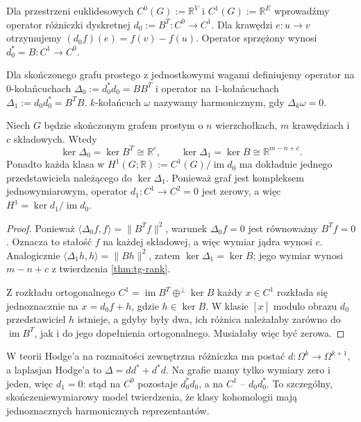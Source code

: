 Dla przestrzeni euklidesowych $C^0(G):=\mathbb R^V$
i $C^1(G):=\mathbb R^E$ wprowadźmy operator
różniczki dyskretnej $d_0:=B^T:C^0\to C^1$.
Dla krawędzi $e:u\to v$ otrzymujemy
$(d_0f)(e)=f(v)-f(u)$.
Operator sprzężony wynosi $d_0^*=B:C^1\to C^0$.

\begin{definicja}
Dla skończonego grafu prostego z jednostkowymi wagami
definiujemy operator na $0$-kołańcuchach
$\Delta_0:=d_0^*d_0=BB^T$ i operator na
$1$-kołańcuchach $\Delta_1:=d_0d_0^*=B^TB$.
$k$-kołańcuch $\omega$ nazywamy harmonicznym,
gdy $\Delta_k\omega=0$.
\end{definicja}

\begin{twierdzenie}
\label{thm:tg-hodge-harmonic}
Niech $G$ będzie skończonym grafem prostym o $n$ wierzchołkach,
$m$ krawędziach i $c$ składowych. Wtedy
\[
\ker\Delta_0=\ker B^T\cong\mathbb R^c,
\qquad
\ker\Delta_1=\ker B\cong\mathbb R^{m-n+c}.
\]
Ponadto każda klasa w
$H^1(G;\mathbb R):=C^1(G)/\operatorname{im}d_0$
ma dokładnie jednego przedstawiciela należącego do
$\ker\Delta_1$. Ponieważ graf jest kompleksem
jednowymiarowym, operator $d_1:C^1\to C^2=0$ jest zerowy,
a więc $H^1=\ker d_1/\operatorname{im}d_0$.
\end{twierdzenie}

\begin{proof}
Ponieważ $\langle\Delta_0f,f\rangle=\|B^Tf\|^2$,
warunek $\Delta_0f=0$ jest równoważny $B^Tf=0$.
Oznacza to stałość $f$ na każdej składowej,
a więc wymiar jądra wynosi $c$.
Analogicznie $\langle\Delta_1h,h\rangle=\|Bh\|^2$,
zatem $\ker\Delta_1=\ker B$; jego wymiar
wynosi $m-n+c$ z twierdzenia \ref{thm:tg-rank}.

Z rozkładu ortogonalnego
$C^1=\operatorname{im}B^T\oplus^\perp\ker B$
każdy $x\in C^1$ rozkłada się jednoznacznie na
$x=d_0f+h$, gdzie $h\in\ker B$. W klasie $[x]$
modulo obrazu $d_0$ przedstawiciel $h$ istnieje,
a gdyby były dwa, ich różnica należałaby zarówno
do $\operatorname{im}B^T$, jak i do jego dopełnienia
ortogonalnego. Musiałaby więc być zerowa.
\end{proof}

\begin{uwaga}
W teorii Hodge'a na rozmaitości zewnętrzna różniczka
ma postać $d:\Omega^k\to\Omega^{k+1}$, a laplasjan
Hodge'a to $\Delta=dd^*+d^*d$. Na grafie mamy tylko
wymiary zero i jeden, więc $d_1=0$: stąd na
$C^0$ pozostaje $d_0^*d_0$, a na $C^1$ -- $d_0d_0^*$.
To szczególny, skończeniewymiarowy model twierdzenia,
że klasy kohomologii mają jednoznacznych harmonicznych
reprezentantów.
\end{uwaga}

